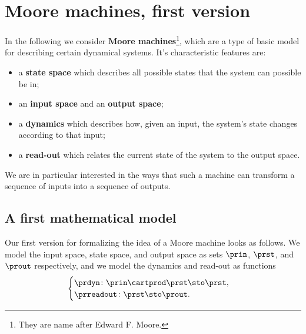 
\section{Moore machines, first version}
\label{sec:moore-machines}



In the following we consider \textbf{Moore machines}\footnote{They are name after Edward F. Moore.}, which are a type of basic model for describing certain dynamical systems. It's characteristic features are:
\begin{itemize}
\item a \textbf{state space} which describes all possible states that the system can possible be in;
\item an \textbf{input space} and an \textbf{output space};
\item a \textbf{dynamics} which describes how, given an input, the system's state changes according to that input;
\item a \textbf{read-out} which relates the current state of the system to the output space.
\end{itemize}
We are in particular interested in the ways that such a machine can transform a sequence of inputs into a sequence of outputs.

 \subsection{A first mathematical model}

Our first version for formalizing the idea of a Moore machine looks as follows. We model the input space, state space, and output space as sets  $\prin$, $\prst$, and $\prout$ respectively, and we model the dynamics and read-out as functions
\begin{equation}
    \label{eq:moore-1}
    \begin{cases}
        \prdyn \colon \prin \cartprod \prst \sto \prst, \\
        \prreadout \colon \prst \sto \prout.
    \end{cases}
\end{equation}




